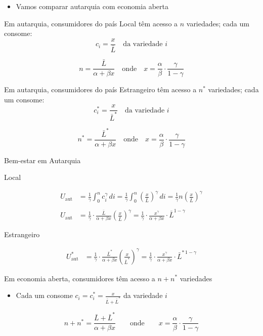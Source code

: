 \documentclass[a4paper,12pt]{article}[abntex2]
\begin{document}
\begin{itemize}
    \item Vamos comparar autarquia com economia aberta
\end{itemize}


Em autarquia, consumidores do país Local têm acesso a \(n\) variedades; cada um consome:
\[
c_i = \frac{x}{\bar{L}} \quad \text{da variedade } i
\]

\[
n = \frac{\bar{L}}{\alpha + \beta x}
\quad \text{onde} \quad
x = \frac{\alpha}{\beta} \cdot \frac{\gamma}{1 - \gamma}
\]


Em autarquia, consumidores do país Estrangeiro têm acesso a \(n^*\) variedades; cada um consome:
\[
c^*_i = \frac{x}{\bar{L}^*} \quad \text{da variedade } i
\]

\[
n^* = \frac{\bar{L}^*}{\alpha + \beta x}
\quad \text{onde} \quad
x = \frac{\alpha}{\beta} \cdot \frac{\gamma}{1 - \gamma}
\]

Bem-estar em Autarquia

Local

\begin{align*}
U_{\text{aut}} &= \frac{1}{\gamma} \int_0^n c_i^\gamma \, di 
= \frac{1}{\gamma} \int_0^n \left( \frac{x}{\bar{L}} \right)^\gamma \, di 
= \frac{1}{\gamma} n \left( \frac{x}{\bar{L}} \right)^\gamma \\
\\
U_{\text{aut}} &= \frac{1}{\gamma} \cdot \frac{\bar{L}}{\alpha + \beta x} \left( \frac{x}{\bar{L}} \right)^\gamma 
= \frac{1}{\gamma} \cdot \frac{x^\gamma}{\alpha + \beta x} \cdot \bar{L}^{1 - \gamma}
\end{align*}

Estrangeiro

\begin{align*}
U^*_{\text{aut}} 
&= \frac{1}{\gamma} \cdot \frac{\bar{L}^*}{\alpha + \beta x} \left( \frac{x}{\bar{L}^*} \right)^\gamma 
= \frac{1}{\gamma} \cdot \frac{x^\gamma}{\alpha + \beta x} \cdot \bar{L}^{* \, 1 - \gamma}
\end{align*}

Em economia aberta, consumidores têm acesso a \( n + n^* \) variedades

\begin{itemize}
  \item Cada um consome \( c_i = c_i^* = \frac{x}{\bar{L} + \bar{L}^*} \) da variedade \( i \)
\end{itemize}

\[
n + n^* = \frac{\bar{L} + \bar{L}^*}{\alpha + \beta x}
\qquad \text{onde} \qquad
x = \frac{\alpha}{\beta} \cdot \frac{\gamma}{1 - \gamma}
\]
\end{document}
